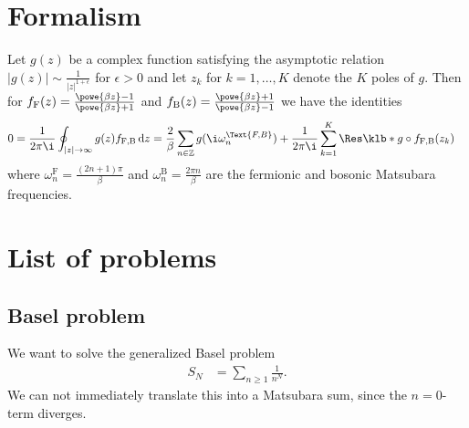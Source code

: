\documentclass[english, parskip=full]{scrartcl}
\title{\titel}
\author{\autor}
\date{\today}
\begin{document}
\maketitle  %


\section{Formalism}
Let $g(z)$ be a complex function satisfying the asymptotic relation $|g(z)| \sim \frac{1}{|z|^{1+\epsilon}}$ for $\epsilon > 0$ and let $z_k$ for $k=1,\dots,K$ denote the $K$ poles of $g$.
Then for $f_\text{F}(z) = \frac{\powe{\beta z} - 1}{\powe{\beta z} + 1}$ and $f_\text{B}(z) = \frac{\powe{\beta z} + 1}{\powe{\beta z} - 1}$ we have the identities
\begin{align}
0 &= \frac{1}{2\pi\i} \oint_{|z| \rightarrow\infty} g(z) f_{\text{F,B}} \,\mathrm{d}z = \frac{2}{\beta} \sum_{n\in\mathbb{Z}} g(\i\omega_n^\Text{F,B}) + \frac{1}{2\pi\i}\sum_{k=1}^K \Res\klb*{g\circ f_\text{F,B} }(z_k)
\end{align}
where $\omega_n^\text{F} = \frac{(2n+1)\pi}{\beta}$ and $\omega_n^\text{B} = \frac{2\pi n}{\beta}$ are the fermionic and bosonic Matsubara frequencies.
\section{List of problems}
\subsection{Basel problem}
We want to solve the generalized Basel problem
\begin{align}
S_{N} &= \sum_{n\ge 1} \frac{1}{n^{N}}.
\end{align}
We can not immediately translate this into a Matsubara sum, since the $n=0$-term diverges.
\end{document}
